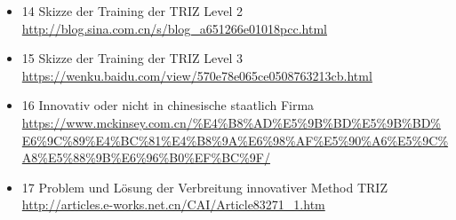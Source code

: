 \documentclass[11pt,a4paper]{article}
\begin{document}
\begin{itemize}
\item 14  Skizze der Training der TRIZ Level 2
\url{http://blog.sina.com.cn/s/blog_a651266e01018pcc.html}
\item 15 Skizze der Training der TRIZ Level 3
\url{https://wenku.baidu.com/view/570e78e065ce0508763213cb.html}
\item 16 Innovativ oder nicht in chinesische staatlich Firma
\url{https://www.mckinsey.com.cn/%E4%B8%AD%E5%9B%BD%E5%9B%BD%E6%9C%89%E4%BC%81%E4%B8%9A%E6%98%AF%E5%90%A6%E5%9C%A8%E5%88%9B%E6%96%B0%EF%BC%9F/}
\item 17 Problem und Lösung der Verbreitung innovativer Method TRIZ
\url{http://articles.e-works.net.cn/CAI/Article83271_1.htm}
\end{itemize}
\end{document}
